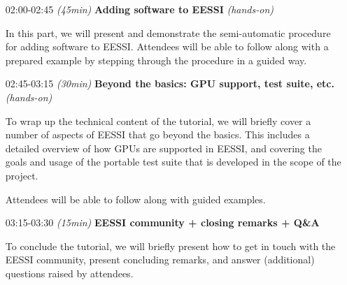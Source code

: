 \begin{itemize}[style=standard, labelwidth=1.9cm]
 \item [02:00-02:45] \emph{(45min)} \textbf{Adding software to EESSI} \emph{(hands-on)}

        In this part, we will present and demonstrate the semi-automatic procedure for adding software to EESSI.
        Attendees will be able to follow along with a prepared example by stepping through the procedure in a guided
        way.

 \item [02:45-03:15] \emph{(30min)} \textbf{Beyond the basics: GPU support, test suite, etc.} \emph{(hands-on)}

        To wrap up the technical content of the tutorial, we will briefly cover a number of aspects of EESSI that go beyond the
        basics. This includes a detailed overview of how GPUs are supported in EESSI, and covering the goals and usage
        of the portable test suite that is developed in the scope of the project.

        Attendees will be able to follow along with guided examples.

 \item [03:15-03:30] \emph{(15min)} \textbf{EESSI community + closing remarks + Q\&A}

        To conclude the tutorial, we will briefly present how to get in touch with the EESSI community,
        present concluding remarks, and answer (additional) questions raised by attendees.

\end{itemize}
